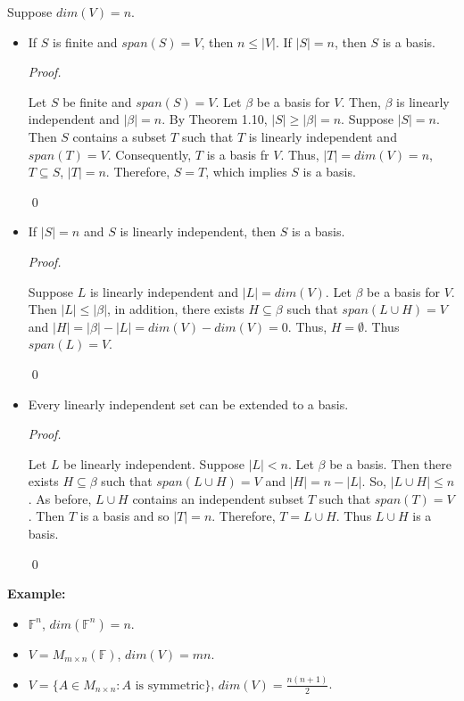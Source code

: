 \documentclass[12pt]{article}
\newenvironment{corollary}[2][Corollary]{\begin{trivlist}
\item[\hskip \labelsep {\bfseries #1}\hskip \labelsep {\bfseries #2}]}{\end{trivlist}}
\newenvironment{sol}
    {\emph{Proof.}
    }
    {
    \qed
    }
\begin{document}
\begin{corollary}{14}
Suppose $dim(V) = n$.
\begin{itemize}
    \item[(a)] If $S$ is finite and $span(S) = V$, then $n \leq \left| V \right|$. If $\left| S \right| = n$, then $S$ is a basis.
    
    \begin{sol}
    Let $S$ be finite and $span(S) = V$. Let $\beta$ be a basis for $V$. Then, $\beta$ is linearly independent and $| \beta | = n$. By Theorem 1.10, $| S | \geq | \beta | = n$.
    Suppose $| S | = n$. Then $S$ contains a subset $T$ such that $T$ is linearly independent and $span(T) = V$. Consequently, $T$ is a basis fr $V$. Thus, $|T| = dim(V) = n$, $T \subseteq S$, $|T| = n$. Therefore, $S = T$, which implies $S$ is a basis.
    \end{sol}
    
    \item[(b)] If $\left| S \right| = n$ and $S$ is linearly independent, then $S$ is a basis. 
    
    \begin{sol}
    Suppose $L$ is linearly independent and $|L| = dim(V)$. Let $\beta$ be a basis for $V$. Then $|L| \leq | \beta |$, in addition, there exists $H \subseteq \beta$ such that $span(L \cup H) = V$ and $| H | = | \beta | - |L| = dim(V) - dim(V) = 0$. Thus, $H = \emptyset$. Thus $span(L) = V$.
    \end{sol}
    
    \item[(c)] Every linearly independent set can be extended to a basis.
    
    \begin{sol}
    Let $L$ be linearly independent. Suppose $|L| < n$. Let $\beta$ be a basis. Then there exists $H \subseteq \beta$ such that $span(L \cup H) = V$ and $|H| = n - |L|$. So, $|L \cup H| \leq n$. As before, $L \cup H$ contains an independent subset $T$ such that $span(T) = V$. Then $T$ is a basis and so $|T| = n$. Therefore, $T = L \cup H$. Thus $L \cup H$ is a basis.
    \end{sol}
\end{itemize}
\end{corollary}

\textbf{Example:} 

\begin{itemize}
    \item[(1)] $\mathbb{F}^n$, $dim(\mathbb{F}^n) = n$.
    
    \item[(2)] $V = M_{m \times n}(\mathbb{F})$, $dim(V) = mn$.
    
    \item[(3)] $V = \{A \in M_{n \times n} : A \text{ is symmetric}\}$, $dim(V) = \frac{n(n+1)}{2}$.
\end{itemize}
\end{document}
